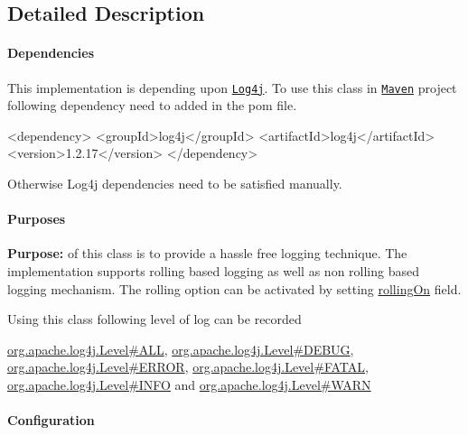 \subsection{Detailed Description}
\paragraph*{Dependencies}

This implementation is depending upon \href{https://logging.apache.org/log4j/}{\tt Log4j}. To use this class in \href{https://maven.apache.org/}{\tt Maven} project following dependency need to added in the pom file. 
\begin{DoxyPre}

\begin{DoxyCode}
<dependency>
<groupId>log4j</groupId>
<artifactId>log4j</artifactId>
<version>1.2.17</version>
</dependency>
\end{DoxyCode}
 
 \end{DoxyPre}
 Otherwise Log4j dependencies need to be satisfied manually. \paragraph*{Purposes}

{\bfseries Purpose\+:} of this class is to provide a hassle free logging technique. The implementation supports rolling based logging as well as non rolling based logging mechanism. The rolling option can be activated by setting \mbox{\hyperlink{classnet_1_1dlinkddns_1_1atulsaurabh_1_1hasselfreelogger_1_1impl_1_1_hassel_free_logger_a7d4b387ecfa16af11b2b169ac3f062a3}{rolling\+On}} field.

Using this class following level of log can be recorded 
\begin{DoxyPre}
 \mbox{\hyperlink{}{org.apache.log4j.Level#ALL}}, \mbox{\hyperlink{}{org.apache.log4j.Level#DEBUG}},
 \mbox{\hyperlink{}{org.apache.log4j.Level#ERROR}}, \mbox{\hyperlink{}{org.apache.log4j.Level#FATAL}},
 \mbox{\hyperlink{}{org.apache.log4j.Level#INFO}} and \mbox{\hyperlink{}{org.apache.log4j.Level#WARN}}
 \end{DoxyPre}


\paragraph*{Configuration}

